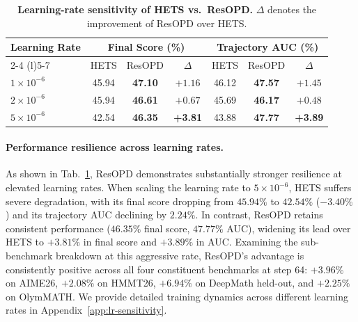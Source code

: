 \begin{table}[t]
\centering
\small
\caption{\textbf{Learning-rate sensitivity of HETS vs.\ ResOPD.} $\Delta$ denotes the improvement of ResOPD over HETS.}
\vspace{-2mm}
\label{tab:lr-sensitivity}
\renewcommand{\arraystretch}{1.18}
\setlength{\tabcolsep}{7pt}
\begin{tabular}{@{}l cc c cc c@{}}
\toprule
\multirow{2}{*}{\textbf{Learning Rate}}
& \multicolumn{3}{c}{\textbf{Final Score (\%)}}
& \multicolumn{3}{c}{\textbf{Trajectory AUC (\%)}} \\
\cmidrule(lr){2-4} \cmidrule(l){5-7}
& HETS & ResOPD & $\Delta$
& HETS & ResOPD & $\Delta$ \\
\midrule
$1\times10^{-6}$ & 45.94 & \textbf{47.10} & $+1.16$ & 46.12 & \textbf{47.57} & $+1.45$ \\
$2\times10^{-6}$ & 45.94 & \textbf{46.61} & $+0.67$ & 45.69 & \textbf{46.17} & $+0.48$ \\
$5\times10^{-6}$ & 42.54 & \textbf{46.35} & \textbf{+3.81} & 43.88 & \textbf{47.77} & \textbf{+3.89} \\
\bottomrule
\end{tabular}
\vspace{-4mm}
\end{table}

\paragraph{Performance resilience across learning rates.}
As shown in Tab.~\ref{tab:lr-sensitivity}, ResOPD demonstrates substantially stronger resilience at elevated learning rates. When scaling the learning rate to $5\times10^{-6}$, HETS suffers severe degradation, with its final score dropping from $45.94\%$ to $42.54\%$ ($-3.40\%$) and its trajectory AUC declining by $2.24\%$. In contrast, ResOPD retains consistent performance ($46.35\%$ final score, $47.77\%$ AUC), widening its lead over HETS to $+3.81\%$ in final score and $+3.89\%$ in AUC.
Examining the sub-benchmark breakdown at this aggressive rate, ResOPD's advantage is consistently positive across all four constituent benchmarks at step 64: $+3.96\%$ on AIME26, $+2.08\%$ on HMMT26, $+6.94\%$ on DeepMath held-out, and $+2.25\%$ on OlymMATH. We provide detailed training dynamics across different learning rates in Appendix~\ref{app:lr-sensitivity}.
\vspace{-4mm}

